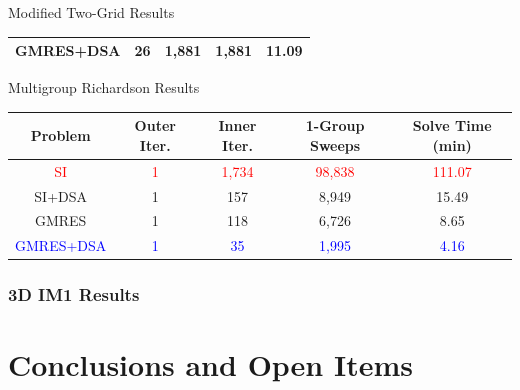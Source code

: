 \documentclass[compress,10pt]{beamer}
\newcommand{\tcr}[1]{\textcolor{red}{#1}}
\newcommand{\tcb}[1]{\textcolor{blue}{#1}}
\begin{document}
\begin{frame}[t]
{{\begin{block}{Modified Two-Grid Results}
\begin{table}
\begin{tabular}{|c|c|c|c|c|}
GMRES+DSA & 26 & 1,881 & 1,881 & 11.09  \\ \hline
\end{tabular}
\end{table}
\end{block}
\vspace{-3mm}
\begin{block}{Multigroup Richardson Results}
\begin{table}
\begin{tabular}{|c|c|c|c|c|}
\hline
Problem & Outer Iter. & Inner Iter. & 1-Group Sweeps & Solve Time (min)  \\
\hline \hline
\tcr{SI} & \tcr{1} & \tcr{1,734} & \tcr{98,838} &  \tcr{111.07} \\ \hline
SI+DSA & 1 & 157 & 8,949 &  15.49 \\ \hline
GMRES & 1 & 118 & 6,726 &  8.65 \\ \hline
\tcb{GMRES+DSA} &  \tcb{1}& \tcb{35} & \tcb{1,995} &  \tcb{4.16} \\ \hline
\end{tabular}
\end{table}
\end{block}
}
}
\end{frame}
\begin{frame}[t]\frametitle{3D IM1 Results}

\end{frame}
\typeout{***********************************************************************************}
\section{Conclusions and Open Items}
\end{document}
